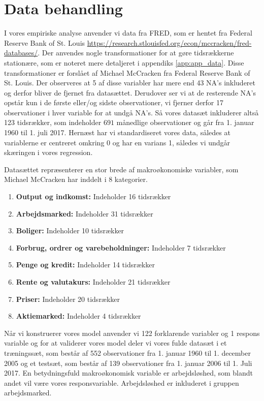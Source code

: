 \chapter{Data behandling}
I vores empiriske analyse anvender vi data fra FRED, som er hentet fra Federal Reserve Bank of St. Louis \url{https://research.stlouisfed.org/econ/mccracken/fred-databases/}.
Der anvendes nogle transformationer for at gøre tidsrækkerne stationære, som er noteret mere detaljeret i appendiks \ref{app:app_data}. 
Disse transformationer er forslået af Michael McCracken fra Federal Reserve Bank of St. Louis.  
Der observeres at 5 af disse variabler har mere end 43 NA's inkluderet og derfor bliver de fjernet fra datasættet. 
Derudover ser vi at de resterende NA's opstår kun i de første eller/og sidste observationer, vi fjerner derfor 17 observationer i hver variable for at undgå NA's. 
Så vores datasæt inkluderer altså 123 tidsrækker, som indeholder $691$ månedlige observationer og går fra 1. januar 1960 til 1. juli 2017. 
Hernæst har vi standardiseret vores data, således at variablerne er centreret omkring 0 og har en varians 1, således vi undgår skæringen i vores regression. 

Datasættet repræsenterer en stor brede af makroøkonomiske variabler, som Michael McCracken har inddelt i 8 kategorier. 
\begin{enumerate}
\item \textbf{Output og indkomst:} Indeholder 16 tidsrækker
\item \textbf{Arbejdsmarked:}  Indeholder 31 tidsrækker
\item \textbf{Boliger:} Indeholder 10 tidsrækker
\item \textbf{Forbrug, ordrer og varebeholdninger:} Indeholder 7 tidsrækker
\item \textbf{Penge og kredit:} Indeholder 14 tidsrækker
\item\textbf{ Rente og valutakurs:} Indeholder 21 tidsrækker
\item \textbf{Priser:} Indeholder 20 tidsrækker
\item \textbf{Aktiemarked:} Indeholder 4 tidsrækker
\end{enumerate}

Når vi konstruerer vores model anvender vi 122 forklarende variabler og 1 respons variable og for at validerer vores model deler vi vores fulde datasæt i et træningssæt, som består af 552 observationer fra 1. januar 1960 til 1. december 2005 og et testsæt, som består af 139 observationer fra 1. januar 2006 til 1. Juli 2017. 
En betydningsfuld makroøkonomisk variable er arbejdsløshed, som blandt andet vil være vores responsvariable.  Arbejdsløshed er inkluderet i gruppen arbejdsmarked. 


